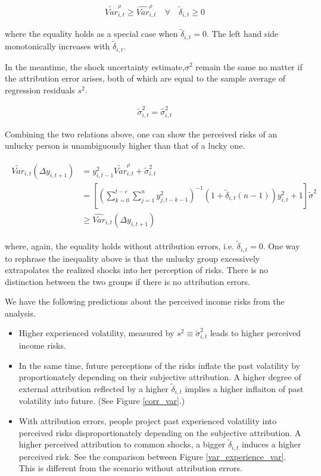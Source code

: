 \documentclass[12pt,notitlepage,onecolumn,aps,pra]{article}
\begin{document}
\begin{eqnarray}
\tilde {Var}^{\rho}_{i,t} \geq \widehat {Var}^{\rho}_{i,t} \quad \forall \quad \tilde\delta_{i,t} \geq 0
\end{eqnarray}

where the equality holds as a special case when
\(\tilde\delta_{i,t} = 0\). The left hand side monotonically increases
with \(\tilde \delta_{i,t}\).

In the meantime, the shock uncertainty estimate,\(\sigma^2\) remain the
same no matter if the attribution error arises, both of which are equal
to the sample average of regression residuals \(s^2\).

\begin{eqnarray}
\tilde{\sigma}^2_{i,t} = \widehat{\sigma}^2_{i,t}
\end{eqnarray}

Combining the two relations above, one can show the perceived risks of
an unlucky person is unambiguously higher than that of a lucky one.

\begin{eqnarray}
\begin{split}
\tilde {Var}_{i,t}(\Delta y_{i,t+1}) & = y_{i,t-1}^2 \tilde{Var}^{\rho}_{i,t} + \tilde{\sigma}^2_{i,t} \\
& = [(\sum^{t-c}_{k=0}\sum^{n}_{j=1}y^2_{j,t-k-1})^{-1}(1+ \tilde\delta_{i,t}(n-1))y^2_{i,t} + 1] \tilde{\sigma}^2\\
& \geq \widehat {Var}_{i,t}(\Delta y_{i,t+1}) 
\end{split}
\end{eqnarray}

where, again, the equality holds without attribution errors, i.e.
\(\tilde \delta_{i,t} = 0\). One way to rephrase the inequality above is
that the unlucky group excessively extrapolates the realized shocks into
her perception of risks. There is no distinction between the two groups
if there is no attribution errors.

We have the following predictions about the perceived income risks from
the analysis.

\begin{itemize}
\item
  Higher experienced volatility, measured by
  \(s^2 \equiv \tilde{\sigma}^2_{i,t}\) leads to higher perceived income
  risks.
\item
  In the same time, future perceptions of the risks inflate the past
  volatility by proportionately depending on their subjective
  attribution. A higher degree of external attribution reflected by a
  higher \(\tilde \delta_{i,t}\) implies a higher inflaiton of past
  volatility into future. (See Figure \ref{corr_var}.)
\item
  With attribution errors, people project past experienced volatility
  into perceived risks disproportionately depending on the subjective
  attribution. A higher perceived attribution to common shocks, a bigger
  \(\tilde \delta_{i,t}\) induces a higher perceived risk. See the
  comparison between Figure \ref{var_experience_var}. This is different
  from the scenario without attribution errors.
\end{itemize}
\end{document}
